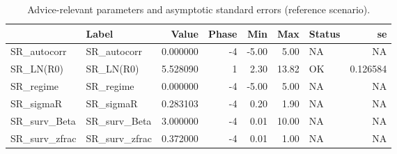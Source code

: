 \begin{table}

\caption{\label{tab:internal-advice-pars}Advice-relevant parameters and asymptotic standard errors (reference scenario).}
\centering
\begin{tabular}[t]{llrrrrlr}
\toprule
  & Label & Value & Phase & Min & Max & Status & se\\
\midrule
SR\_autocorr & SR\_autocorr & 0.000000 & -4 & -5.00 & 5.00 & NA & NA\\
SR\_LN(R0) & SR\_LN(R0) & 5.528090 & 1 & 2.30 & 13.82 & OK & 0.126584\\
SR\_regime & SR\_regime & 0.000000 & -4 & -5.00 & 5.00 & NA & NA\\
SR\_sigmaR & SR\_sigmaR & 0.283103 & -4 & 0.20 & 1.90 & NA & NA\\
SR\_surv\_Beta & SR\_surv\_Beta & 3.000000 & -4 & 0.01 & 10.00 & NA & NA\\
\addlinespace
SR\_surv\_zfrac & SR\_surv\_zfrac & 0.372000 & -4 & 0.01 & 1.00 & NA & NA\\
\bottomrule
\end{tabular}
\end{table}

